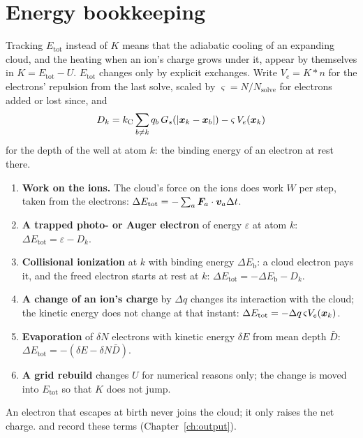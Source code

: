 \section{Energy bookkeeping}
\label{sec:energy}

Tracking $E_{\mathrm{tot}}$ instead of $K$ means that the adiabatic cooling of an expanding cloud, and the heating
when an ion's charge grows under it, appear by themselves in $K = E_{\mathrm{tot}} - U$.
$E_{\mathrm{tot}}$ changes only by explicit exchanges.
Write $V_e = K*n$ for the electrons' repulsion from the last solve, scaled by $\varsigma = N/N_{\mathrm{solve}}$ for
electrons added or lost since, and
\begin{equation}
  D_k = k_{\mathrm C}\sum_{b\ne k} q_b\,G_s(|\bm{x}_k-\bm{x}_b|) - \varsigma\,V_e(\bm{x}_k)
  \label{eq:Dk}
\end{equation}
for the depth of the well at atom $k$: the binding energy of an electron at rest there.
\begin{enumerate}
  \item \textbf{Work on the ions.} The cloud's force on the ions does work $W$ per step, taken from the electrons:
    $\Delta E_{\mathrm{tot}} = -\sum_a\bm{F}_a\cdot\bm{v}_a\Delta t$.
  \item \textbf{A trapped photo- or Auger electron} of energy $\varepsilon$ at atom $k$:
    $\Delta E_{\mathrm{tot}} = \varepsilon - D_k$.
  \item \textbf{Collisional ionization} at $k$ with binding energy $\Delta E_{\mathrm b}$: a cloud electron pays it, and
    the freed electron starts at rest at $k$: $\Delta E_{\mathrm{tot}} = -\Delta E_{\mathrm b} - D_k$.
  \item \textbf{A change of an ion's charge} by $\Delta q$ changes its interaction with the cloud; the kinetic energy does
    not change at that instant: $\Delta E_{\mathrm{tot}} = -\Delta q\,\varsigma V_e(\bm{x}_k)$.
  \item \textbf{Evaporation} of $\delta N$ electrons with kinetic energy $\delta E$ from mean depth $\bar D$:
    $\Delta E_{\mathrm{tot}} = -(\delta E - \delta N\bar D)$.
  \item \textbf{A grid rebuild} changes $U$ for numerical reasons only; the change is moved into $E_{\mathrm{tot}}$ so
    that $K$ does not jump.
\end{enumerate}
An electron that escapes at birth never joins the cloud; it only raises the net charge.
 and  record these terms (Chapter~\ref{ch:output}).

